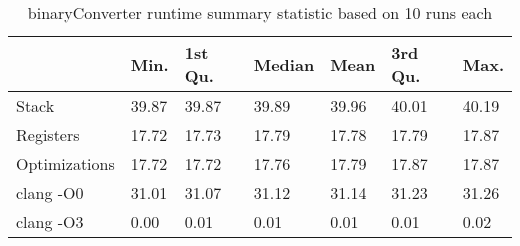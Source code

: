 \begin{table}[h!]
\centering
\begin{tabular}{p{}p{}p{}p{}p{}p{}p{}}
  \hline
 & Min. & 1st Qu. & Median & Mean & 3rd Qu. & Max. \\ 
  \hline
Stack & 39.87 & 39.87 & 39.89 & 39.96 & 40.01 & 40.19 \\ 
  Registers & 17.72 & 17.73 & 17.79 & 17.78 & 17.79 & 17.87 \\ 
  Optimizations & 17.72 & 17.72 & 17.76 & 17.79 & 17.87 & 17.87 \\ 
  clang -O0 & 31.01 & 31.07 & 31.12 & 31.14 & 31.23 & 31.26 \\ 
  clang -O3 & 0.00 & 0.01 & 0.01 & 0.01 & 0.01 & 0.02 \\ 
   \hline
\end{tabular}
\caption{binaryConverter runtime summary statistic based on 10 runs each}
\end{table}
